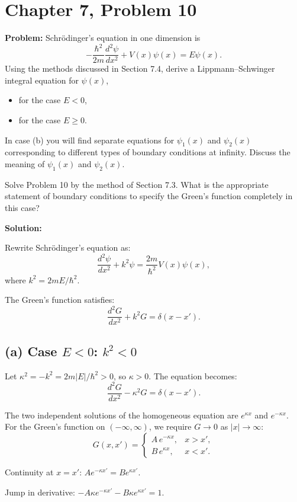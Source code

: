\documentclass[12pt]{article}
\begin{document}
\section*{Chapter 7, Problem 10}

\textbf{Problem:} Schr\"odinger's equation in one dimension is
\[
-\frac{\hbar^2}{2m}\frac{d^2\psi}{dx^2} + V(x)\psi(x) = E\psi(x).
\]
Using the methods discussed in Section 7.4, derive a Lippmann--Schwinger integral equation for $\psi(x)$,
\begin{itemize}
\item[a)] for the case $E < 0$,
\item[b)] for the case $E \ge 0$.
\end{itemize}
In case (b) you will find separate equations for $\psi_1(x)$ and $\psi_2(x)$ corresponding to different types of boundary conditions at infinity. Discuss the meaning of $\psi_1(x)$ and $\psi_2(x)$.

Solve Problem 10 by the method of Section 7.3. What is the appropriate statement of boundary conditions to specify the Green's function completely in this case?

\bigskip
\textbf{Solution:}

Rewrite Schr\"odinger's equation as:
\[
\frac{d^2\psi}{dx^2} + k^2\psi = \frac{2m}{\hbar^2}V(x)\psi(x),
\]
where $k^2 = 2mE/\hbar^2$.

The Green's function satisfies:
\[
\frac{d^2G}{dx^2} + k^2 G = \delta(x - x').
\]

\subsection*{(a) Case $E < 0$: $k^2 < 0$}

Let $\kappa^2 = -k^2 = 2m|E|/\hbar^2 > 0$, so $\kappa > 0$. The equation becomes:
\[
\frac{d^2G}{dx^2} - \kappa^2 G = \delta(x-x').
\]

The two independent solutions of the homogeneous equation are $e^{\kappa x}$ and $e^{-\kappa x}$. For the Green's function on $(-\infty,\infty)$, we require $G \to 0$ as $|x| \to \infty$:
\[
G(x,x') = \begin{cases} A\,e^{-\kappa x}, & x > x', \\ B\,e^{\kappa x}, & x < x'. \end{cases}
\]

Continuity at $x = x'$: $Ae^{-\kappa x'} = Be^{\kappa x'}$.

Jump in derivative: $-A\kappa e^{-\kappa x'} - B\kappa e^{\kappa x'} = 1$.
\end{document}
